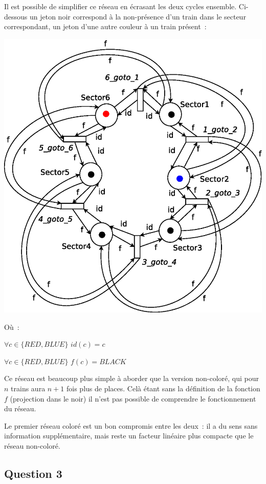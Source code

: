 Il est possible de simplifier ce réseau en écrasant les deux cycles ensemble. 
Ci-dessous un jeton noir correspond à la non-présence d'un train dans le secteur 
correspondant, un jeton d'une autre couleur à un train présent~:

\begin{center}
\includegraphics[height = 0.5\paperwidth]{exo8_coloured_2_v2.eps}
\end{center}

Où~:

$\forall c \in \{RED, BLUE\}$ $id(c) = c$

$\forall c \in \{RED, BLUE\}$ $f(c) = BLACK$

Ce réseau est beaucoup plus simple à aborder que la version non-coloré, qui pour
$n$ trains aura $n+1$ fois plus de places. Celà étant sans la définition de la
fonction $f$ (projection dans le noir) il n'est pas possible de comprendre le 
fonctionnement du réseau. 

Le premier réseau coloré est un bon compromis entre les deux~: il a du sens sans
information supplémentaire, mais reste un facteur linéaire plus compacte que le 
réseau non-coloré.


\subsection*{Question 3}

